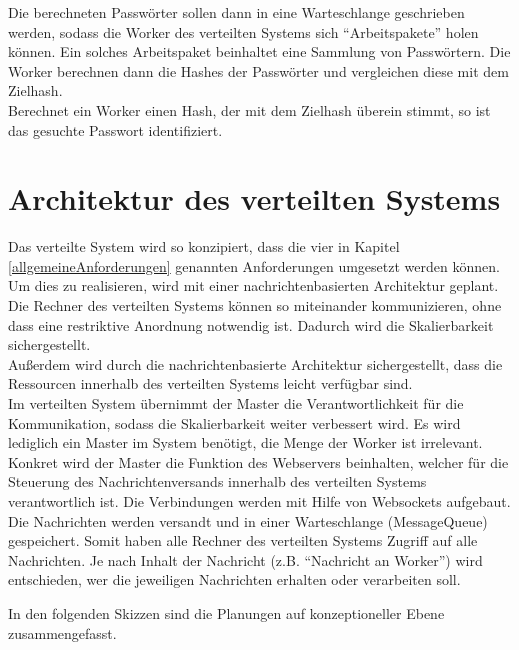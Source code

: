 Die berechneten Passwörter sollen dann in eine Warteschlange geschrieben werden, sodass die Worker des verteilten Systems sich \enquote{Arbeitspakete} holen können. Ein solches Arbeitspaket beinhaltet eine Sammlung von Passwörtern. Die Worker berechnen dann die Hashes der Passwörter und vergleichen diese mit dem Zielhash.\\
 Berechnet ein Worker einen Hash, der mit dem Zielhash überein stimmt, so ist das gesuchte Passwort identifiziert.  


\section{Architektur des verteilten Systems}
Das verteilte System wird so konzipiert, dass die vier in Kapitel \ref{allgemeineAnforderungen} genannten Anforderungen umgesetzt werden können. Um dies zu realisieren, wird mit einer nachrichtenbasierten Architektur geplant. Die Rechner des verteilten Systems können so miteinander kommunizieren, ohne dass eine restriktive Anordnung notwendig ist. Dadurch wird die Skalierbarkeit sichergestellt. \\
Außerdem wird durch die nachrichtenbasierte Architektur sichergestellt, dass die Ressourcen innerhalb des verteilten Systems leicht verfügbar sind. \\
Im verteilten System übernimmt der Master die Verantwortlichkeit für die Kommunikation, sodass die Skalierbarkeit weiter verbessert wird. Es wird lediglich ein Master im System benötigt, die Menge der Worker ist irrelevant. Konkret wird der Master die Funktion des Webservers beinhalten, welcher für die Steuerung des Nachrichtenversands innerhalb des verteilten Systems verantwortlich ist. Die Verbindungen werden mit Hilfe von Websockets aufgebaut.\\
Die Nachrichten werden versandt und in einer Warteschlange (MessageQueue) gespeichert. Somit haben alle Rechner des verteilten Systems Zugriff auf alle Nachrichten. Je nach Inhalt der Nachricht (z.B. \enquote{Nachricht an Worker}) wird entschieden, wer die jeweiligen Nachrichten erhalten oder verarbeiten soll. 

In den folgenden Skizzen sind die Planungen auf konzeptioneller Ebene zusammengefasst.





